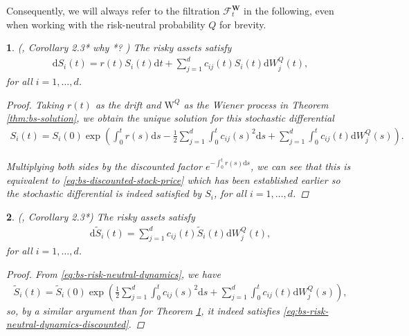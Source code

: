 \documentclass[english]{article}
\newcommand{\comment}[1]{\color{blue}#1\color{black}}
\numberwithin{equation}{section}
\numberwithin{figure}{section}
\theoremstyle{bolddescit}
\newtheorem{theorem}{\protect\theoremname}[section]
\theoremstyle{definition}
\theoremstyle{definition}
\theoremstyle{plain}
\theoremstyle{plain}
\theoremstyle{bolddesc}
\theoremstyle{plain}
\theoremstyle{remark}
\providecommand{\theoremname}{Theorem}
\begin{document}
Consequently, we will always refer to the filtration $\mathcal{F}^\mathbf{W}_t$ in the following, even when working with the risk-neutral probability $Q$ for brevity.

\begin{theorem}\label{thm:bs-risk-neutral-dynamics}
  (\cite{capinski_blackscholes_2012}, Corollary 2.3*
\comment{why *?}
  )
  The risky assets satisfy
  \begin{align*}
    \mathrm{d}S_i(t) = r(t) S_i(t) \mathrm{d}t + \sum_{j=1}^{d} c_{ij}(t) S_i(t) \mathrm{d}W^Q_j(t),
  \end{align*}
  for all $i=1,\ldots,d$.

  \begin{proof}
    Taking $r(t)$ as the drift and $\mathrm{W}^Q$ as the Wiener process in Theorem \ref{thm:bs-solution}, we obtain the unique solution for this stochastic differential
    \begin{align}\label{eq:bs-risk-neutral-dynamics}
      S_i(t)
      = S_i(0) \exp  \left( \int_0^t r(s) \mathrm{d}s - \frac{1}{2} \sum_{j=1}^{d} \int_0^t c_{ij}(s)^2 \mathrm{d}s + \sum_{j=1}^d \int_0^t c_{ij}(t) \mathrm{d}W^Q_j(s)\right).
    \end{align}

    Multiplying both sides by the discounted factor $e^{-\int_0^t r(s) \mathrm{d}s}$, we can see that this is equivalent to \eqref{eq:bs-discounted-stock-price} which has been established earlier so the stochastic differential is indeed satisfied by $S_i$, for all $i=1,\ldots,d$.
  \end{proof}
\end{theorem}

\begin{theorem}\label{thm:bs-risk-neutral-dynamics-discounted}
  (\cite{capinski_blackscholes_2012}, Corollary 2.3*)
  The risky assets satisfy
  \begin{align}\label{eq:bs-risk-neutral-dynamics-discounted}
    \mathrm{d}\widetilde{S}_i(t) = \sum_{j=1}^{d} c_{ij}(t) \widetilde{S}_i(t) \mathrm{d}W^Q_j(t),
  \end{align}
  for all $i=1,\ldots,d$.

  \begin{proof}
    From \eqref{eq:bs-risk-neutral-dynamics}, we have
    \begin{align*}
      \widetilde{S}_i(t)
      = \widetilde{S}_i(0) \exp \left( \frac{1}{2} \sum_{j=1}^{d} \int_0^t c_{ij}(s)^2 \mathrm{d}s + \sum_{j=1}^d \int_0^t c_{ij}(t) \mathrm{d}W^Q_j(s)\right),
    \end{align*}
    so, by a similar argument than for Theorem \ref{thm:bs-risk-neutral-dynamics}, it indeed satisfies \eqref{eq:bs-risk-neutral-dynamics-discounted}.
  \end{proof}
\end{theorem}
\end{document}
